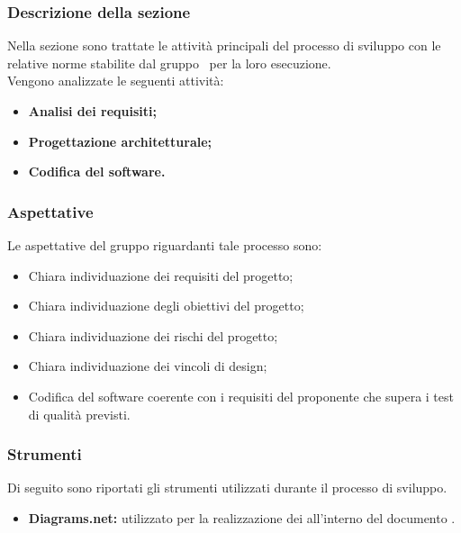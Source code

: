 \subsubsection{Descrizione della sezione} 
Nella sezione sono trattate le attività principali del processo di sviluppo con le relative norme stabilite dal gruppo \Gruppo\ per la loro esecuzione.\\
Vengono analizzate le seguenti attività:
\begin{itemize}
\item \textbf{Analisi dei requisiti;}
\item \textbf{Progettazione architetturale;}
\item \textbf{Codifica del software.}
\end{itemize}

\subsubsection{Aspettative}
Le aspettative del gruppo riguardanti tale processo sono:
\begin{itemize}
\item Chiara individuazione dei requisiti del progetto;
\item Chiara individuazione degli obiettivi del progetto;
\item Chiara individuazione dei rischi del progetto;
\item Chiara individuazione dei vincoli di design;
\item Codifica del software coerente con i requisiti del proponente che supera i test di qualità previsti.
\end{itemize}





\subsubsection{Strumenti}\label{PS_Strumenti}
Di seguito sono riportati gli strumenti utilizzati durante il processo di sviluppo.
\begin{itemize}
	\item \textbf{Diagrams.net:} utilizzato per la realizzazione dei  all'interno del documento .
\end{itemize}
\newpage